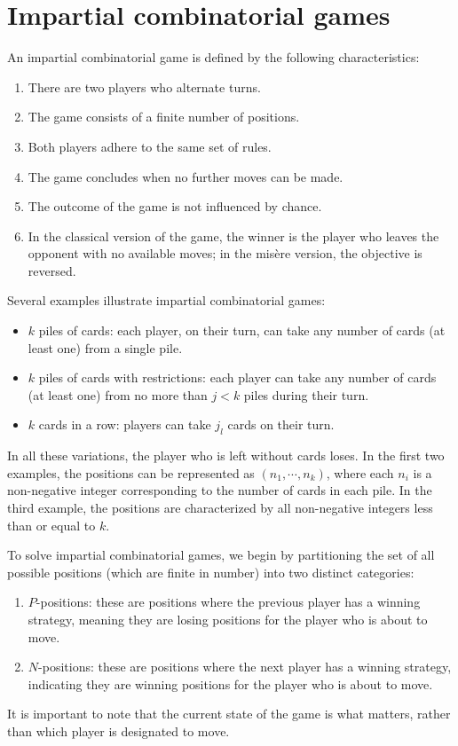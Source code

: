 \section{Impartial combinatorial games}

\begin{definition}
    An impartial combinatorial game is defined by the following characteristics:
\end{definition}
\begin{enumerate}
    \item There are two players who alternate turns.
    \item The game consists of a finite number of positions.
    \item Both players adhere to the same set of rules.
    \item The game concludes when no further moves can be made.
    \item The outcome of the game is not influenced by chance.
    \item In the classical version of the game, the winner is the player who leaves the opponent with no available moves; in the misère version, the objective is reversed.
\end{enumerate}
\begin{example}
    Several examples illustrate impartial combinatorial games:
    \begin{itemize}
        \item $k$ piles of cards: each player, on their turn, can take any number of cards (at least one) from a single pile.
        \item $k$ piles of cards with restrictions: each player can take any number of cards (at least one) from no more than $j < k$ piles during their turn.
        \item $k$ cards in a row: players can take $j_l$ cards on their turn.
    \end{itemize}
    In all these variations, the player who is left without cards loses. 
    In the first two examples, the positions can be represented as $(n_1, \cdots , n_k)$, where each  $n_i$ is a non-negative integer corresponding to the number of cards in each pile.
    In the third example, the positions are characterized by all non-negative integers less than or equal to $k$.
\end{example}
To solve impartial combinatorial games, we begin by partitioning the set of all possible positions (which are finite in number) into two distinct categories:
\begin{enumerate}
    \item $P$-positions: these are positions where the previous player has a winning strategy, meaning they are losing positions for the player who is about to move.
    \item $N$-positions: these are positions where the next player has a winning strategy, indicating they are winning positions for the player who is about to move.
\end{enumerate}
It is important to note that the current state of the game is what matters, rather than which player is designated to move.

